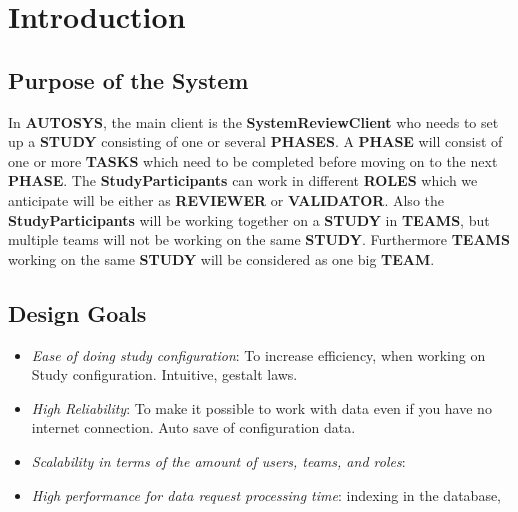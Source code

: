 \section{Introduction}

\subsection{Purpose of the System}
In \textbf{AUTOSYS}, the main client is the \textbf{SystemReviewClient} who needs to set up a \textbf{STUDY} consisting of one or several \textbf{PHASES}. A \textbf{PHASE} will consist of one or more \textbf{TASKS} which need to be completed before moving on to the next \textbf{PHASE}. The \textbf{StudyParticipants} can work in different \textbf{ROLES} which we anticipate will be either as \textbf{REVIEWER} or \textbf{VALIDATOR}. Also the \textbf{StudyParticipants} will be working together on a \textbf{STUDY} in \textbf{TEAMS}, but multiple teams will not be working on the same \textbf{STUDY}. Furthermore \textbf{TEAMS} working on the same \textbf{STUDY} will be considered as one big \textbf{TEAM}.


\subsection{Design Goals}
\begin{itemize}
\item \textit{Ease of doing study configuration}: To increase efficiency, when working on Study configuration. Intuitive, gestalt laws.
\item \textit{High Reliability}: To make it possible to work with data even if you have no internet connection. Auto save of configuration data.
\item \textit{Scalability in terms of the amount of users, teams, and roles}:
\item \textit{High performance for data request processing time}: indexing in the database, 

\end{itemize}